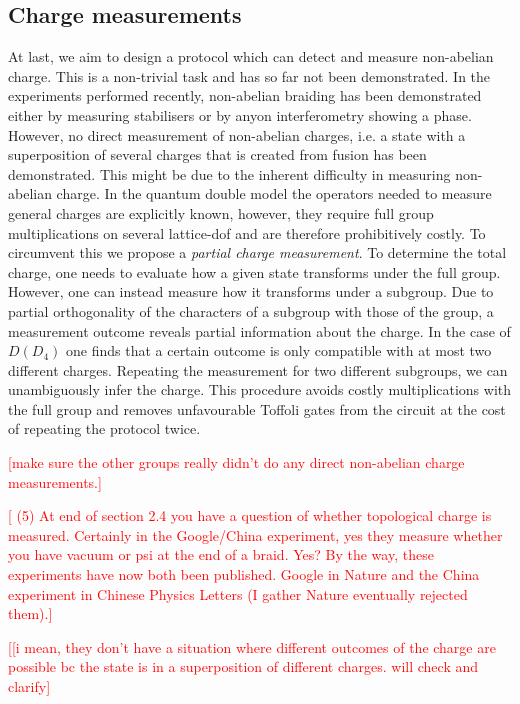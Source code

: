 \documentclass[two column]{article}
\newcommand{\caro}[1]{\textcolor{red}{[#1]}}
\begin{document}
\subsection{Charge measurements}
At last, we aim to design a protocol which can detect and measure non-abelian charge. This is a non-trivial task and has so far not been demonstrated. In the experiments performed recently, non-abelian braiding has been demonstrated either by measuring stabilisers \cite{andersen2022observation} or by anyon interferometry showing a phase. However, no direct measurement of non-abelian charges, i.e. a state with a superposition of several charges that is created from fusion has been demonstrated. This might be due to the inherent difficulty in measuring non-abelian charge. In the quantum double model the operators needed to measure general charges are explicitly known, however, they require full group multiplications on several lattice-dof and are therefore prohibitively costly. To circumvent this we propose a \emph{partial charge measurement}. To determine the total charge, one needs to evaluate how a given state transforms under the full group. However, one can instead measure how it transforms under a subgroup. Due to partial orthogonality of the characters of a subgroup with those of the group, a measurement outcome reveals partial information about the charge. In the case of $D(D_4)$ one finds that a certain outcome is only compatible with at most two different charges. Repeating the measurement for two different subgroups, we can unambiguously infer the charge. This procedure avoids costly multiplications with the full group and removes unfavourable Toffoli gates from the circuit at the cost of repeating the protocol twice.

\caro{make sure the other groups really didn't do any direct non-abelian charge measurements.}

\caro{
(5) At end of section 2.4 you have a question of whether topological charge is measured.  Certainly in the Google/China experiment, yes they measure whether you have vacuum or psi at the end of a braid.  Yes?    By the way, these experiments have now both been published.   Google in Nature and the China experiment in Chinese Physics Letters (I gather Nature eventually rejected them).}

\caro{[i mean, they don't have a situation where different outcomes of the charge are possible bc the state is in a superposition of different charges. will check and clarify}
\end{document}
